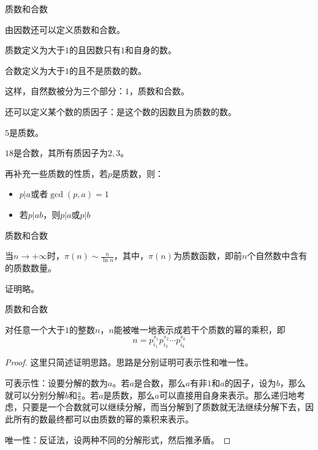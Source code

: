 \documentclass{ctexbeamer}        %
\begin{document}
\begin{frame}{质数和合数}

\begin{definition}[质数和合数]
    由因数还可以定义质数和合数。

    质数定义为大于$1$的且因数只有$1$和自身的数。

    合数定义为大于$1$的且不是质数的数。

    这样，自然数被分为三个部分：$1$，质数和合数。

    还可以定义某个数的质因子：是这个数的因数且为质数的数。
\end{definition}

\begin{example}
    $5$是质数。
    
    $18$是合数，其所有质因子为$2,3$。
\end{example}

再补充一些质数的性质，若$p$是质数，则：

\begin{itemize}
    \item $p|a$或者$\gcd(p,a)=1$
    \item 若$p|ab$，则$p|a$或$p|b$
\end{itemize}

\end{frame}

\begin{frame}{质数和合数}

\begin{theorem}[质数定理]
    当$n \to +\infty$时，$\pi(n) \sim \frac{n}{\ln n}$，其中，$\pi(n)$为质数函数，即前$n$个自然数中含有的质数数量。
\end{theorem}

证明略。
\end{frame}

\begin{frame}{质数和合数}

\begin{theorem}[唯一分解定理]
    对任意一个大于$1$的整数$n$，$n$能被唯一地表示成若干个质数的幂的乘积，即
    $$n=p_{i_1}^{s_1}p_{i_2}^{s_2}\cdots p_{i_k}^{s_k}$$
\end{theorem}

\begin{proof}
    这里只简述证明思路。思路是分别证明可表示性和唯一性。

    可表示性：设要分解的数为$a$。若$a$是合数，那么$a$有非$1$和$a$的因子，设为$b$，那么就可以分别分解$b$和$\frac{a}{b}$。若$a$是质数，那么$a$可以直接用自身来表示。那么递归地考虑，只要是一个合数就可以继续分解，而当分解到了质数就无法继续分解下去，因此所有的数最终都可以由质数的幂的乘积来表示。

    唯一性：反证法，设两种不同的分解形式，然后推矛盾。
\end{proof}

\end{frame}
\end{document}
